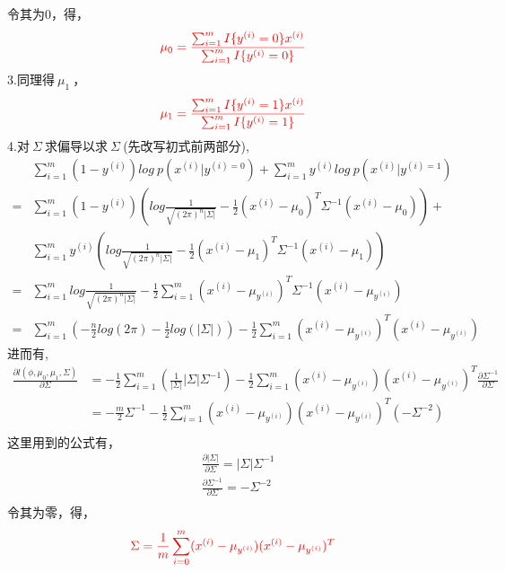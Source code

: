 令其为0，得，
\begin{equation}\nonumber
\begin{split}
  {\textcolor{red}{\mu_0=\frac{\sum_{i=1}^{m}I\{y^{(i)}=0\}x^{(i)}}{\sum_{i=1}^{m}I\{y^{(i)}=0\}}}}\\
\end{split}
\end{equation}
3.同理得$~\mu_1~$，
\begin{equation}\nonumber
\begin{split}
  {\textcolor{red}{\mu_1=\frac{\sum_{i=1}^{m}I\{y^{(i)}=1\}x^{(i)}}{\sum_{i=1}^{m}I\{y^{(i)}=1\}}}}\\
\end{split}
\end{equation}
4.对$~\Sigma~$求偏导以求$~\Sigma~$(先改写初式前两部分),
\begin{equation}\nonumber
\begin{split}
  &\sum_{i=1}^{m}(1-y^{(i)})log~p(x^{(i)}|y^{(i)=0})+\sum_{i=1}^{m}y^{(i)}log~p(x^{(i)}|y^{(i)=1})\\
  =&\sum_{i=1}^{m}(1-y^{(i)})(log\frac{1}{\sqrt{(2\pi)^n|\Sigma|}}-\frac{1}{2}(x^{(i)}-\mu_0)^T\Sigma^{-1}(x^{(i)}-\mu_0))+\\
   &\sum_{i=1}^{m}y^{(i)}(log\frac{1}{\sqrt{(2\pi)^n|\Sigma|}}-\frac{1}{2}(x^{(i)}-\mu_1)^T\Sigma^{-1}(x^{(i)}-\mu_1))\\
  =& \sum_{i=1}^{m}log\frac{1}{\sqrt{(2\pi)^n|\Sigma|}}-\frac{1}{2}\sum_{i=1}^{m}(x^{(i)}-\mu_{y^{(i)}})^T\Sigma^{-1}(x^{(i)}-\mu_{y^{(i)}})\\
  =&\sum_{i=1}^{m}(-\frac{n}{2}log(2\pi)-\frac{1}{2}log(|\Sigma|))-\frac{1}{2}\sum_{i=1}^{m}(x^{(i)}-\mu_{y^{(i)}})^T(x^{(i)}-\mu_{y^{(i)}})
\end{split}
\end{equation}
进而有,
\begin{equation}\nonumber
\begin{split}
  \frac{\partial l(\phi,\mu_0,\mu_1,\Sigma)}{\partial\Sigma}&=-\frac{1}{2}\sum_{i=1}^{m}(\frac{1}{|\Sigma|}|\Sigma|\Sigma^{-1})-\frac{1}{2}\sum_{i=1}^{m}(x^{(i)}-\mu_{y^{(i)}})(x^{(i)}-\mu_{y^{(i)}})^T\frac{\partial\Sigma^{-1}}{\partial\Sigma}\\
  &=-\frac{m}{2}\Sigma^{-1}-\frac{1}{2}\sum_{i=1}^{m}(x^{(i)}-\mu_{y^{(i)}})(x^{(i)}-\mu_{y^{(i)}})^T(-\Sigma^{-2})\\
\end{split}
\end{equation}
这里用到的公式有，
\begin{equation}\nonumber
\begin{split}
  &\frac{\partial|\Sigma|}{\partial\Sigma}=|\Sigma|\Sigma^{-1}\\
  &\frac{\partial\Sigma^{-1}}{\partial\Sigma}=-\Sigma^{-2}\\
\end{split}
\end{equation}
令其为零，得，
\begin{equation}\nonumber
\begin{split}
  {\textcolor{red}{\Sigma=\frac{1}{m}\sum_{i=0}^{m}(x^{(i)}-\mu_{y^{(i)}})(x^{(i)}-\mu_{y^{(i)}})^T}}
\end{split}
\end{equation}

